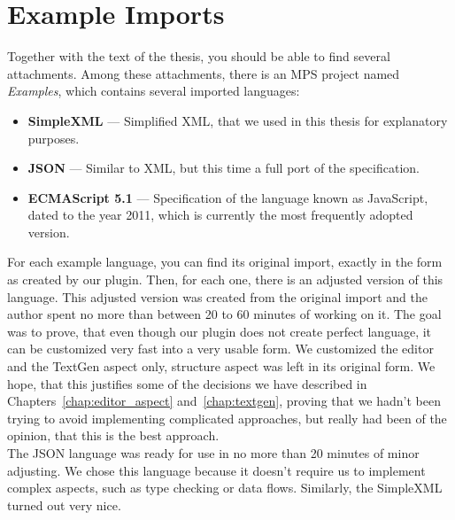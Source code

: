 \chapter{Example Imports}
\label{chap:examples}

Together with the text of the thesis, you should be able to find several attachments.
Among these attachments, there is an MPS project named \textit{Examples}, which contains several imported languages:

\begin{itemize}
	\item \textbf{SimpleXML} --- Simplified XML, that we used in this thesis for explanatory purposes.

	\item \textbf{JSON} --- Similar to XML, but this time a full port of the specification.

	\item \textbf{ECMAScript 5.1} --- Specification of the language known as JavaScript, dated to the year 2011, which is currently the most frequently adopted version.
\end{itemize}

For each example language, you can find its original import, exactly in the form as created by our plugin.
Then, for each one, there is an adjusted version of this language.
This adjusted version was created from the original import and the author spent no more than between 20 to 60 minutes of working on it.
The goal was to prove, that even though our plugin does not create perfect language, it can be customized very fast into a very usable form.
We customized the editor and the TextGen aspect only, structure aspect was left in its original form.
We hope, that this justifies some of the decisions we have described in Chapters~\ref{chap:editor_aspect} and~\ref{chap:textgen}, proving that we hadn't been trying to avoid implementing complicated approaches, but really had been of the opinion, that this is the best approach.
\\

The JSON language was ready for use in no more than 20 minutes of minor adjusting.
We chose this language because it doesn't require us to implement complex aspects, such as type checking or data flows.
Similarly, the SimpleXML turned out very nice.
\\

